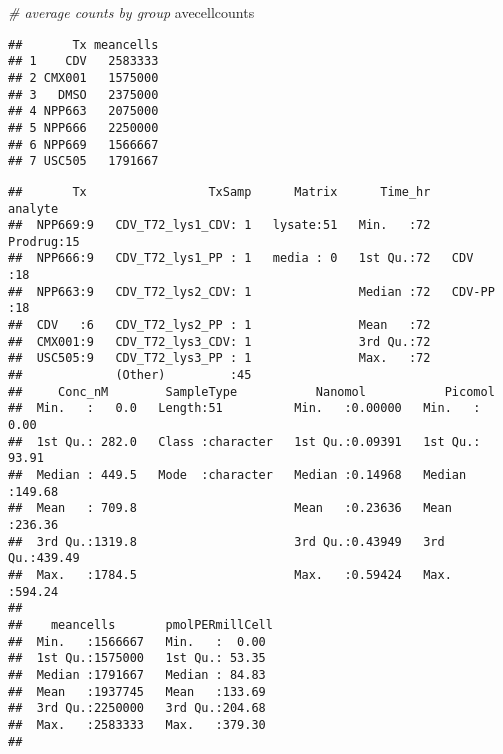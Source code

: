 \documentclass[]{article}
\newenvironment{Shaded}{\begin{snugshade}}{\end{snugshade}}
\newcommand{\CommentTok}[1]{\textcolor[rgb]{0.56,0.35,0.01}{\textit{#1}}}
\newcommand{\DataTypeTok}[1]{\textcolor[rgb]{0.13,0.29,0.53}{#1}}
\newcommand{\FloatTok}[1]{\textcolor[rgb]{0.00,0.00,0.81}{#1}}
\newcommand{\KeywordTok}[1]{\textcolor[rgb]{0.13,0.29,0.53}{\textbf{#1}}}
\newcommand{\NormalTok}[1]{#1}
\newcommand{\OperatorTok}[1]{\textcolor[rgb]{0.81,0.36,0.00}{\textbf{#1}}}
\newcommand{\StringTok}[1]{\textcolor[rgb]{0.31,0.60,0.02}{#1}}
\begin{document}
\begin{Shaded}
\begin{Highlighting}[]
\CommentTok{# average counts by group}
\NormalTok{avecellcounts}
\end{Highlighting}
\end{Shaded}

\begin{verbatim}
##       Tx meancells
## 1    CDV   2583333
## 2 CMX001   1575000
## 3   DMSO   2375000
## 4 NPP663   2075000
## 5 NPP666   2250000
## 6 NPP669   1566667
## 7 USC505   1791667
\end{verbatim}

\begin{Shaded}
\end{Shaded}

\begin{verbatim}
##       Tx                 TxSamp      Matrix      Time_hr      analyte  
##  NPP669:9   CDV_T72_lys1_CDV: 1   lysate:51   Min.   :72   Prodrug:15  
##  NPP666:9   CDV_T72_lys1_PP : 1   media : 0   1st Qu.:72   CDV    :18  
##  NPP663:9   CDV_T72_lys2_CDV: 1               Median :72   CDV-PP :18  
##  CDV   :6   CDV_T72_lys2_PP : 1               Mean   :72               
##  CMX001:9   CDV_T72_lys3_CDV: 1               3rd Qu.:72               
##  USC505:9   CDV_T72_lys3_PP : 1               Max.   :72               
##             (Other)         :45                                        
##     Conc_nM        SampleType           Nanomol           Picomol      
##  Min.   :   0.0   Length:51          Min.   :0.00000   Min.   :  0.00  
##  1st Qu.: 282.0   Class :character   1st Qu.:0.09391   1st Qu.: 93.91  
##  Median : 449.5   Mode  :character   Median :0.14968   Median :149.68  
##  Mean   : 709.8                      Mean   :0.23636   Mean   :236.36  
##  3rd Qu.:1319.8                      3rd Qu.:0.43949   3rd Qu.:439.49  
##  Max.   :1784.5                      Max.   :0.59424   Max.   :594.24  
##                                                                        
##    meancells       pmolPERmillCell 
##  Min.   :1566667   Min.   :  0.00  
##  1st Qu.:1575000   1st Qu.: 53.35  
##  Median :1791667   Median : 84.83  
##  Mean   :1937745   Mean   :133.69  
##  3rd Qu.:2250000   3rd Qu.:204.68  
##  Max.   :2583333   Max.   :379.30  
## 
\end{verbatim}
\end{document}

